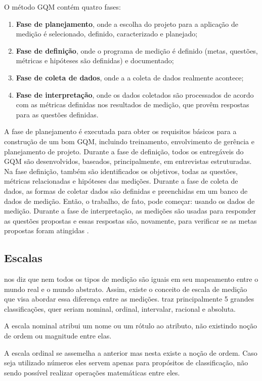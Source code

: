  O método GQM contém quatro fases:
\begin{enumerate}
  \item   \textbf{Fase de planejamento}, onde a escolha do projeto para a aplicação de
  medição é selecionado, definido, caracterizado e planejado;
  \item  \textbf{Fase de definição}, onde o programa de medição é definido (metas, questões,
  métricas e hipóteses são definidas) e documentado;
  \item  \textbf{Fase de coleta de dados}, onde a a coleta de dados realmente acontece;
  \item  \textbf{Fase de interpretação}, onde os dados coletados são processados de
  acordo com as métricas definidas nos resultados de medição, que provêm
  respostas para as questões definidas.
\end{enumerate}

A fase de planejamento é executada para obter os requisitos básicos para a
construção de um bom GQM, incluindo treinamento, envolvimento de gerência e
planejamento de projeto. Durante a fase de definição, todos os entregáveis do
GQM são desenvolvidos, baseados, principalmente, em entrevistas estruturadas.
Na fase definição, também são identificados os objetivos, todas as questões,
métricas relacionadas e hipóteses das medições. Durante a fase de coleta de
dados, as formas de coletar dados são definidas e preenchidas em um banco de
dados de medição. Então, o trabalho, de
fato, pode começar: usando os dados de medição. Durante a fase de interpretação,
as medições são usadas para responder as questões propostas e essas respostas são,
novamente, para verificar se as metas propostas foram atingidas \cite{egon}.


\subsection{Escalas}
\cite{fenton} nos diz que nem todos os tipos de medição são iguais em seu mapeamento
entre o mundo real e o mundo abstrato. Assim, existe o conceito de escala de
medição que visa abordar essa diferença entre as medições. \cite{fenton} traz principalmente
5 grandes classificações, quer seriam nominal, ordinal, intervalar, racional e
absoluta.

A escala nominal atribui um nome ou um rótulo ao atributo, não existindo noção
de ordem ou magnitude entre elas.

A escala ordinal se assemelha a anterior mas nesta existe a noção de ordem. Caso
seja utilizado números eles servem apenas para propósitos de classificação, não
sendo possível realizar operações matemáticas entre eles.

